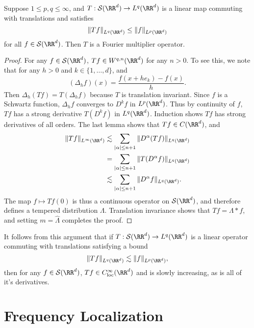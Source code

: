 \begin{theorem}
  Suppose $1 \leq p,q \leq \infty$, and $T: \mathcal{S}(\RR^d) \to L^q(\RR^d)$ is a linear map commuting with translations and satisfies
  \[ \| Tf \|_{L^q(\RR^d)} \leq \| f \|_{L^p(\RR^d)} \]
  for all $f \in \mathcal{S}(\RR^d)$. Then $T$ is a Fourier multiplier operator.
\end{theorem}
\begin{proof}
  For any $f \in \mathcal{S}(\RR^d)$, $Tf \in W^{q,n}(\RR^d)$ for any $n > 0$. To see this, we note that for any $h > 0$ and $k \in \{ 1, \dots, d \}$, and
  \[ (\Delta_h f)(x) = \frac{f(x + he_k) - f(x)}{h}. \]
  Then $\Delta_h(T f) = T(\Delta_h f)$ because $T$ is translation invariant. Since $f$ is a Schwartz function, $\Delta_h f$ converges to $D^k f$ in $L^p(\RR^d)$. Thus by continuity of $f$, $Tf$ has a strong derivative $T(D^k f)$ in $L^q(\RR^d)$. Induction shows $Tf$ has strong derivatives of all orders. The last lemma shows that $Tf \in C(\RR^d)$, and
  \begin{align*}
    \| Tf \|_{L^\infty(\RR^d)} &\lesssim \sum_{|\alpha| \leq n+1} \| D^\alpha(Tf) \|_{L^q(\RR^d)}\\
    &= \sum_{|\alpha| \leq n+1} \| T(D^\alpha f) \|_{L^q(\RR^d)}\\
    &\lesssim \sum_{|\alpha| \leq n+1} \| D^\alpha f \|_{L^q(\RR^d)}.
  \end{align*}
  The map $f \mapsto Tf(0)$ is thus a continuous operator on $\mathcal{S}(\RR^d)$, and therefore defines a tempered distribution $\Lambda$. Translation invariance shows that $Tf = \Lambda * f$, and setting $m = \widehat{\Lambda}$ completes the proof.
\end{proof}

\begin{remark}
    It follows from this argument that if $T: \mathcal{S}(\RR^d) \to L^q(\RR^d)$ is a linear operator commuting with translations satisfying a bound
    \[ \| Tf \|_{L^q(\RR^d)} \lesssim \| f \|_{L^p(\RR^d)}, \]
    then for any $f \in \mathcal{S}(\RR^d)$, $Tf \in C^\infty_{\text{loc}}(\RR^d)$ and is slowly increasing, as is all of it's derivatives.
\end{remark}







\section{Frequency Localization}

